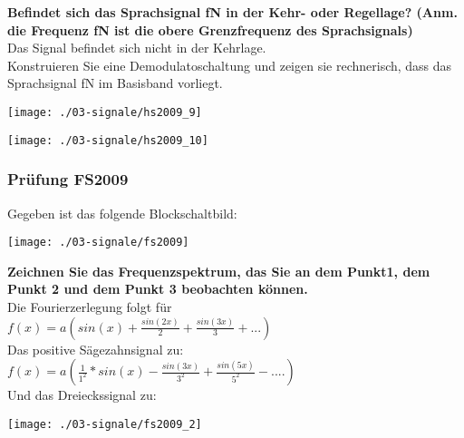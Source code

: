 \textbf{Befindet sich das Sprachsignal fN in der Kehr- oder Regellage? (Anm. die Frequenz fN ist die obere Grenzfrequenz des Sprachsignals)}\\
Das Signal befindet sich nicht in der Kehrlage.\\

Konstruieren Sie eine Demodulatoschaltung und zeigen sie rechnerisch, dass das Sprachsignal fN im Basisband vorliegt.\\
\begin{center}
    \vspace{-8pt}
    \texttt{[image: ./03-signale/hs2009\_9]}
    \vspace{-8pt}
\end{center}

\begin{center}
    \vspace{-8pt}
    \texttt{[image: ./03-signale/hs2009\_10]}
    \vspace{-8pt}
\end{center}

\subsubsection{Prüfung FS2009}
Gegeben ist das folgende Blockschaltbild:
\begin{center}
    \vspace{-8pt}
    \texttt{[image: ./03-signale/fs2009]}
    \vspace{-8pt}
\end{center}

\textbf{Zeichnen Sie das Frequenzspektrum, das Sie an dem Punkt1, dem Punkt 2 und dem Punkt 3 beobachten können.}\\
Die Fourierzerlegung folgt für\\
$f(x)=a(sin(x)+\frac{sin(2x)}{2}+\frac{sin(3x)}{3}+...)$\\

Das positive Sägezahnsignal zu:\\
$f(x)=a(\frac{1}{1^2}*sin(x)-\frac{sin(3x)}{3^2}+\frac{sin(5x)}{5^2}-....)$\\

Und das Dreieckssignal zu:
\begin{center}
    \vspace{-8pt}
    \texttt{[image: ./03-signale/fs2009\_2]}
    \vspace{-8pt}
\end{center}



